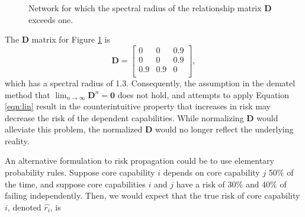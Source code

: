 \documentclass{article}
\begin{document}
\begin{figure}[!htb]
\centering
{}
\caption{Network for which the spectral radius of the relationship matrix $\mathbf{D}$ exceeds one.}
\label{fig:ovary}
\end{figure}
The $\mathbf{D}$ matrix for Figure \ref{fig:ovary} is 
\begin{equation*}
\mathbf{D} = 
\begin{bmatrix}
0 & 0 & 0.9 \\
0 & 0 & 0.9 \\
0.9 & 0.9 & 0\\
\end{bmatrix},
\end{equation*}
which has a spectral radius of 1.3. Consequently, the assumption in the \ac{dematel} method that $\lim_{n\rightarrow \infty} \mathbf{D}^n = \mathbf{0}$ does not hold, and attempts to apply Equation \ref{eqn:lin} result in the counterintuitive property that increases in risk may decrease the risk of the dependent capabilities. While normalizing $\mathbf{D}$ would alleviate this problem, the normalized $\mathbf{D}$ would no longer reflect the underlying reality. 

An alternative formulation to risk propagation could be to use elementary probability rules. Suppose core capability $i$ depends on core capability $j$ 50\% of the time, and suppose core capabilities $i$ and $j$ have a risk of 30\% and 40\% of failing independently. Then, we would expect that the true risk of core capability $i$, denoted $\hat{r_i}$, is 
\end{document}
